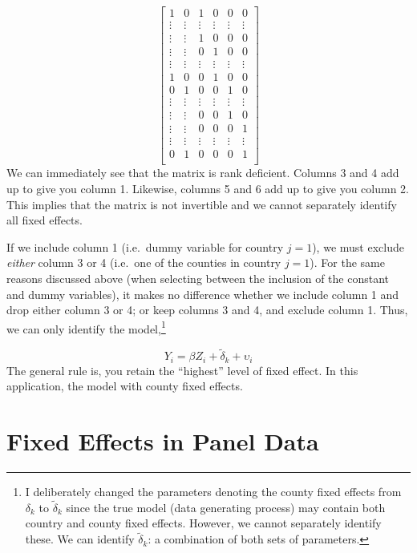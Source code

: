 \documentclass[
  letterpaper,
  DIV=11,
  numbers=noendperiod]{scrreprt}
\begin{document}
\[
  \begin{bmatrix}1 & 0 & 1 & 0 & 0 & 0 \\ 
  \vdots & \vdots & \vdots & \vdots & \vdots & \vdots \\
  \vdots & \vdots & 1 & 0 & 0 & 0 \\
  \vdots & \vdots & 0 & 1 & 0 & 0 \\
  \vdots & \vdots & \vdots & \vdots & \vdots & \vdots \\
  1 & 0 & 0 & 1 & 0 & 0 \\
  0 & 1 & 0 & 0 & 1 & 0 \\
  \vdots & \vdots & \vdots & \vdots & \vdots & \vdots \\
  \vdots & \vdots & 0 & 0 & 1 & 0 \\
  \vdots & \vdots & 0 & 0 & 0 & 1 \\
  \vdots & \vdots & \vdots & \vdots & \vdots & \vdots \\
  0& 1 & 0 & 0 & 0 & 1 \\
  \end{bmatrix}
\] We can immediately see that the matrix is rank deficient. Columns 3
and 4 add up to give you column 1. Likewise, columns 5 and 6 add up to
give you column 2. This implies that the matrix is not invertible and we
cannot separately identify all fixed effects.

If we include column 1 (i.e.~dummy variable for country \(j=1\)), we
must exclude \emph{either} column 3 or 4 (i.e.~one of the counties in
country \(j=1\)). For the same reasons discussed above (when selecting
between the inclusion of the constant and dummy variables), it makes no
difference whether we include column 1 and drop either column 3 or 4; or
keep columns 3 and 4, and exclude column 1. Thus, we can only identify
the model,\footnote{I deliberately changed the parameters denoting the
  county fixed effects from \(\delta_k\) to \(\tilde{\delta}_k\) since
  the true model (data generating process) may contain both country and
  county fixed effects. However, we cannot separately identify these. We
  can identify \(\tilde{\delta}_k\): a combination of both sets of
  parameters.}

\[
Y_i = \beta Z_i + \tilde{\delta}_k + \upsilon_i
\] The general rule is, you retain the ``highest'' level of fixed
effect. In this application, the model with county fixed effects.

\hypertarget{fixed-effects-in-panel-data}{%
\section{Fixed Effects in Panel
Data}\label{fixed-effects-in-panel-data}}
\end{document}
